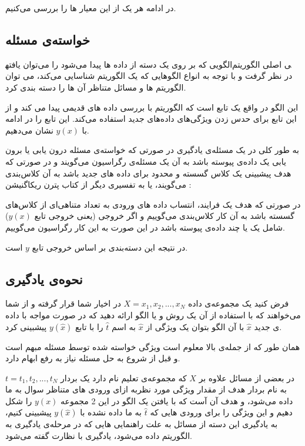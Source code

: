 \documentclass[11pt,a4paper,twocolumn]{article}
\begin{document}
در ادامه هر یک از این معیار ها را بررسی می‌کنیم.
\subsection{خواسته‌ی مسئله}
الگویی که بر روی یک دسته از داده ها پیدا می‌شود را می‌توان یافته‎ی اصلی الگوریتم در نظر گرفت و با توجه به انواع الگوهایی که یک الگوریتم شناسایی می‌کند، می توان الگوریتم ها و مسائل متناظر آن ها را دسته بندی کرد.

این الگو در واقع یک تابع است که الگوریتم با بررسی داده های قدیمی پیدا می کند و از این تابع برای حدس زدن ویژگی‌های داده‌های جدید استفاده می‌کند. این تابع را در ادامه با $y(x)$ نشان می‌دهیم.

به طور کلی در یک مسئله‌ی
یادگیری
در صورتی که خواسته‌ی مسئله 
درون یابی
یا 
برون یابی
یک داده‌ی پیوسته باشد به آن یک مسئله‌ی 
رگراسیون
می‌گویند و در صورتی که هدف پیشبینی یک کلاس گسسته‌ و محدود برای داده های جدید باشد به آن
کلاس‌بندی
می‌گویند، یا به تفسیری دیگر از کتاب پترن ریکاگنیشن :

در صورتی که هدف یک فرایند، انتساب داده های ورودی به تعداد متناهی‌ای از کلاس‌های گسسته باشد به آن کار کلاس‌بندی می‌گوییم و اگر خروجی (یعنی خروجی تابع ‌$y(x)$) شامل یک یا چند داده‌ی پیوسته باشد در این صورت به این کار رگراسیون می‌گوییم.\cite{bishop}

در نتیجه این دسته‌بندی بر اساس خروجی تابع $y$ است.
\subsection{نحوه‌ی یادگیری}
فرض کنید یک مجموعه‌ی داده
$X={ x_1, x_2, ... , x_N}$
در اخیار شما قرار گرفته و از شما می‌خواهند که  با استفاده از آن یک روش و یا الگو ارائه دهید که در صورت مواجه با داده ی جدید
$\widehat x$
با آن الگو بتوان یک ویژگی از
$\widehat x$
به اسم
$\widehat t$
را با تابع
$y(\widehat x)$
پیشبینی کرد.

همان طور که از جمله‌ی بالا معلوم است ویژگی خواسته‌ شده توسط مسئله مبهم است و قبل از شروع به حل مسئله نیاز به رفع ابهام دارد.

در بعضی از مسائل علاوه بر
$X$
که مجموعه‌ی تعلیم
نام دارد یک بردار
$t = { t_1, t_2 ,..., t_N }$
به نام بردار هدف
از مقدار ویژگی مورد نظربه ازای ورودی های متناظر سوال به ما داده می‌شود، و هدف آن آست که با یافتن یک الگو در این 2 مجموعه $y(x)$ را شکل دهیم و این ویژگی را برای ورودی هایی که
$\widehat t$
به ما داده نشده با
$y(\widehat x)$ 
پیشبینی کنیم، به یادگیری این دسته از مسائل به علت راهنمایی هایی که در مرحله‌ی یادگیری به الگوریتم داده می‌شود،
یادگیری با نظارت
 گفته می‌شود.
 
\end{document}
